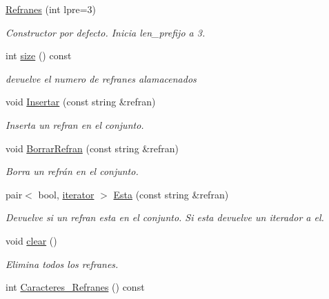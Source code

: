 \begin{DoxyCompactItemize}
\item 
\hyperlink{class_refranes_a48208767ed0c87b67bb1d865165cc921}{Refranes} (int lpre=3)
\begin{DoxyCompactList}\small\item\em Constructor por defecto. Inicia len\+\_\+prefijo a 3. \end{DoxyCompactList}\item 
int \hyperlink{class_refranes_aea4dc940e45f201c1479dd2ba6a753ea}{size} () const \hypertarget{class_refranes_aea4dc940e45f201c1479dd2ba6a753ea}{}\label{class_refranes_aea4dc940e45f201c1479dd2ba6a753ea}

\begin{DoxyCompactList}\small\item\em devuelve el numero de refranes alamacenados \end{DoxyCompactList}\item 
void \hyperlink{class_refranes_a8332ef74ced31681bdb3ad6c864feec9}{Insertar} (const string \&refran)
\begin{DoxyCompactList}\small\item\em Inserta un refran en el conjunto. \end{DoxyCompactList}\item 
void \hyperlink{class_refranes_abd81f45043537e8cfcd5138a7864edb8}{Borrar\+Refran} (const string \&refran)
\begin{DoxyCompactList}\small\item\em Borra un refrán en el conjunto. \end{DoxyCompactList}\item 
pair$<$ bool, \hyperlink{class_refranes_1_1iterator}{iterator} $>$ \hyperlink{class_refranes_a0c16d66bf18195ee4c7ec20c3e06db6f}{Esta} (const string \&refran)
\begin{DoxyCompactList}\small\item\em Devuelve si un refran esta en el conjunto. Si esta devuelve un iterador a el. \end{DoxyCompactList}\item 
void \hyperlink{class_refranes_afca50a716ce083c13a5ab87cbaa45795}{clear} ()\hypertarget{class_refranes_afca50a716ce083c13a5ab87cbaa45795}{}\label{class_refranes_afca50a716ce083c13a5ab87cbaa45795}

\begin{DoxyCompactList}\small\item\em Elimina todos los refranes. \end{DoxyCompactList}\item 
int \hyperlink{class_refranes_a613535ba73502e5138a05fe38df7890d}{Caracteres\+\_\+\+Refranes} () const \hypertarget{class_refranes_a613535ba73502e5138a05fe38df7890d}{}\label{class_refranes_a613535ba73502e5138a05fe38df7890d}


\end{DoxyCompactItemize}
